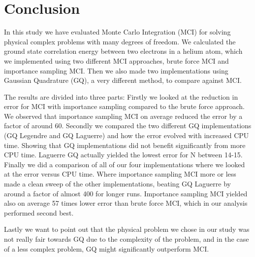 \section{Conclusion}
In this study we have evaluated Monte Carlo Integration (MCI) for solving
physical complex problems with many degrees of freedom. We calculated the ground state correlation energy between two electrons in a helium
atom, which we implemented using two different MCI approaches, brute force MCI
and importance sampling MCI. Then we also made two implementations using
Gaussian Quadrature (GQ), a very different method, to compare against MCI. 

The results are divided into three parts: Firstly we looked at the reduction in
error for MCI with importance sampling compared to the brute force
approach. We observed that importance sampling MCI on average reduced the error
by a factor of around 60. Secondly we compared the
two different GQ implementations (GQ Legendre and GQ Laguerre) and how the error
evolved with increased CPU time. Showing that GQ implementations did not benefit
significantly from more CPU time. Laguerre GQ actually yielded the lowest error 
for N between 14-15. Finally we did a comparison of all of our four
implementations where we looked at the error versus CPU time. Where
importance sampling MCI more or less made a clean sweep of the other
implementations, beating GQ Laguerre by around a factor of almost 400 for longer
runs. Importance sampling MCI yielded also on average 57 times lower error than
brute force MCI, which in our analysis performed second best.      

Lastly we want to point out that the physical problem we chose in our study was
not really fair towards GQ due to the complexity of the problem, and in the case
of a less complex problem, GQ might significantly outperform MCI.
 
